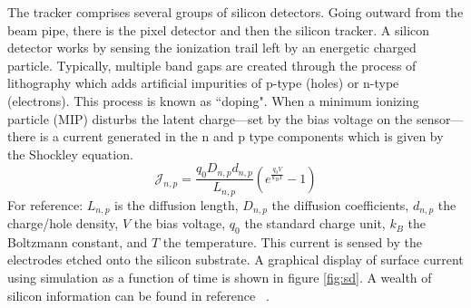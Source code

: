 The tracker comprises several groups of silicon detectors. 
Going outward from the beam pipe, there is the pixel detector and then the silicon tracker.
A silicon detector works by sensing the ionization trail left by an energetic charged particle.
Typically, multiple band gaps are created through the process of lithography which adds artificial impurities of p-type (holes) or n-type (electrons). This process is known as ``doping". When a minimum ionizing particle (MIP) disturbs the latent charge---set by the bias voltage on the sensor---there is a current generated in the n and p type components which is given by the Shockley equation.
\begin{equation}
\label{eq:shockley}
\mathcal{J}_{n,p} = \frac{q_0 D_{n,p} d_{n,p}}{L_{n,p}}\left(e^{\frac{q_0 V}{k_B T}} - 1 \right)
\end{equation}
For reference: $L_{n,p}$ is the diffusion length, $D_{n,p}$ the diffusion coefficients, $d_{n,p}$ the charge/hole density, $V$ the bias voltage, $q_0$ the standard charge unit, $k_B$ the Boltzmann constant, and $T$ the temperature. 
This current is sensed by the electrodes etched onto the silicon substrate. 
A graphical display of surface current using simulation as a function of time is shown in figure \ref{fig:sd}. A wealth of silicon information can be found in reference ~\cite{Eichhorn:2112017}.

